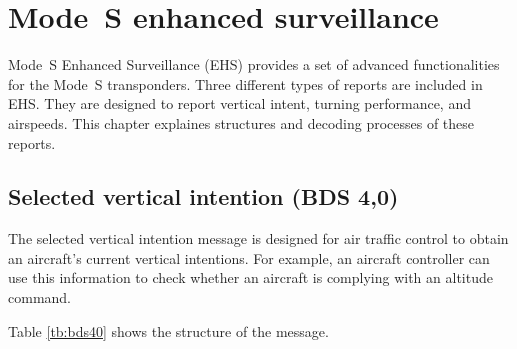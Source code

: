 \chapter{Mode~S enhanced surveillance}

Mode~S Enhanced Surveillance (EHS) provides a set of advanced functionalities for the Mode~S transponders. Three different types of reports are included in EHS. They are designed to report vertical intent, turning performance, and airspeeds. This chapter explaines structures and decoding processes of these reports.

\section{Selected vertical intention (BDS 4,0)}

The selected vertical intention message is designed for air traffic control to obtain an aircraft's current vertical intentions. For example, an aircraft controller can use this information to check whether an aircraft is complying with an altitude command. 

Table \ref{tb:bds40} shows the structure of the message.


